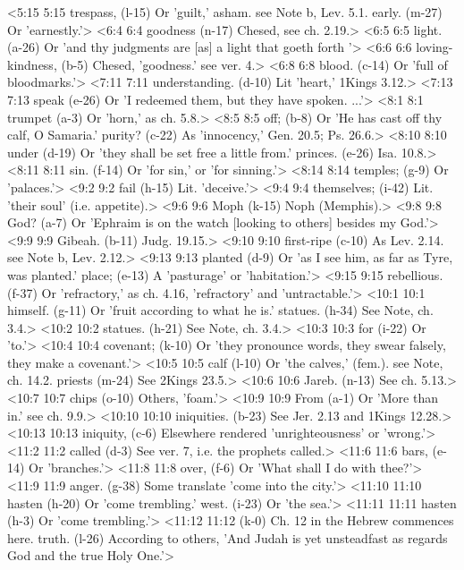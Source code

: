 <5:15 5:15  trespass, (l-15)  Or 'guilt,' asham. see Note b, Lev. 5.1.
  early. (m-27)  Or 'earnestly.'>
<6:4 6:4  goodness (n-17)  Chesed, see ch. 2.19.>
<6:5 6:5  light. (a-26)  Or 'and thy judgments are [as] a light that goeth forth '>
<6:6 6:6  loving-kindness, (b-5)  Chesed, 'goodness.' see ver. 4.>
<6:8 6:8  blood. (c-14)  Or 'full of bloodmarks.'>
<7:11 7:11  understanding. (d-10)  Lit 'heart,' 1Kings 3.12.>
<7:13 7:13  speak (e-26)  Or 'I redeemed them, but they have spoken. ...'>
<8:1 8:1  trumpet (a-3)  Or 'horn,' as ch. 5.8.>
<8:5 8:5  off; (b-8)  Or 'He has cast off thy calf, O Samaria.'
  purity? (c-22)  As 'innocency,' Gen. 20.5; Ps. 26.6.>
<8:10 8:10  under (d-19)  Or 'they shall be set free a little from.'
  princes. (e-26)  Isa. 10.8.>
<8:11 8:11  sin. (f-14)  Or 'for sin,' or 'for sinning.'>
<8:14 8:14  temples; (g-9)  Or 'palaces.'>
<9:2 9:2  fail (h-15)  Lit. 'deceive.'>
<9:4 9:4  themselves; (i-42)  Lit. 'their soul' (i.e. appetite).>
<9:6 9:6  Moph (k-15)  Noph (Memphis).>
<9:8 9:8  God? (a-7)  Or 'Ephraim is on the watch [looking to others] besides my  God.'>
<9:9 9:9  Gibeah. (b-11)  Judg. 19.15.>
<9:10 9:10  first-ripe (c-10)  As Lev. 2.14. see Note b, Lev. 2.12.>
<9:13 9:13  planted (d-9)  Or 'as I see him, as far as Tyre, was planted.'
  place; (e-13)  A 'pasturage' or 'habitation.'>
<9:15 9:15  rebellious. (f-37)  Or 'refractory,' as ch. 4.16, 'refractory' and 'untractable.'>
<10:1 10:1  himself. (g-11)  Or 'fruit according to what he is.'
  statues. (h-34)  See Note, ch. 3.4.>
<10:2 10:2  statues. (h-21)  See Note, ch. 3.4.>
<10:3 10:3  for (i-22)  Or 'to.'>
<10:4 10:4  covenant; (k-10)  Or 'they pronounce words, they swear falsely, they make a  covenant.'>
<10:5 10:5  calf (l-10)  Or 'the calves,' (fem.). see Note, ch. 14.2.
  priests (m-24)  See 2Kings 23.5.>
<10:6 10:6  Jareb. (n-13)  See ch. 5.13.>
<10:7 10:7  chips (o-10)  Others, 'foam.'>
<10:9 10:9  From (a-1)  Or 'More than in.' see ch. 9.9.>
<10:10 10:10  iniquities. (b-23)  See Jer. 2.13 and 1Kings 12.28.>
<10:13 10:13  iniquity, (c-6)  Elsewhere rendered 'unrighteousness' or 'wrong.'>
<11:2 11:2  called (d-3)  See ver. 7, i.e. the prophets called.>
<11:6 11:6  bars, (e-14)  Or 'branches.'>
<11:8 11:8  over, (f-6)  Or 'What shall I do with thee?'>
<11:9 11:9  anger. (g-38)  Some translate 'come into the city.'>
<11:10 11:10  hasten (h-20) Or 'come trembling.'
  west. (i-23)  Or 'the sea.'>
<11:11 11:11  hasten (h-3)  Or 'come trembling.'>
<11:12 11:12   (k-0)  Ch. 12 in the Hebrew commences here.
  truth. (l-26)  According to others, 'And Judah is yet unsteadfast as regards  God and the true Holy One.'>
